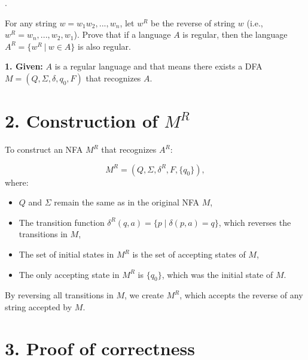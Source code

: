 \documentclass[12pt]{article}
\newcounter{quesnum}
\newcommand{\question}[2][??]{
\begin{list}{\labelitemi}{\leftmargin=2em}
\item [\arabic{quesnum}.] {} {#2}
\end{list}
\addtocounter{quesnum}{1}
}
\begin{document}
\vspace{12pt}

\question[3]{
For any string $w = w_1w_2,...,w_n$, let $w^R$ be the reverse of string $w$ (i.e., $w^R=w_n,...,w_2,w_1$). Prove that if a language $A$ is regular, then the language $A^R = \{w^R \ | \ w \in A\}$ is also regular.


}


\textbf{1. Given:} $A$ is a regular language and that means there exists a DFA $M = (Q, \Sigma, \delta, q_0, F)$ that recognizes $A$.

\section*{2. Construction of \( M^R \)}

To construct an NFA \( M^R \) that recognizes \( A^R \):

\[
M^R = (Q, \Sigma, \delta^R, F, \{q_0\}),
\]
where:
\begin{itemize}
    \item \( Q \) and \( \Sigma \) remain the same as in the original NFA \( M \),
    \item The transition function \( \delta^R(q, a) = \{p \mid \delta(p, a) = q\} \), which reverses the transitions in \( M \),
    \item The set of initial states in \( M^R \) is the set of accepting states of \( M \),
    \item The only accepting state in \( M^R \) is \( \{q_0\} \), which was the initial state of \( M \).
\end{itemize}

By reversing all transitions in \( M \), we create \( M^R \), which accepts the reverse of any string accepted by \( M \).

\section*{3. Proof of correctness}
\end{document}
